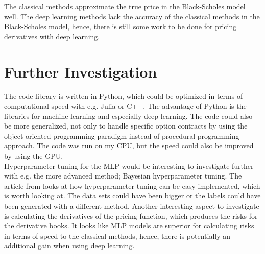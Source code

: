 The classical methods approximate the true price in the Black-Scholes model well. The deep learning methods lack the accuracy of the classical methods in the Black-Scholes model, hence, there is still some work to be done for pricing derivatives with deep learning. 

\section{Further Investigation}
The code library is written in Python, which could be optimized in terms of computational speed with e.g. Julia or C++. The advantage of Python is the libraries for machine learning and especially deep learning. The code could also be more generalized, not only to handle specific option contracts by using the object oriented programming paradigm instead of procedural programming approach. The code was run on my CPU, but the speed could also be improved by using the GPU.\\

Hyperparameter tuning for the MLP would be interesting to investigate further with e.g. the more advanced method; Bayesian hyperparameter tuning. The article from \parencite{liaw2018tune} looks at how hyperparameter tuning can be easy implemented, which is worth looking at. The data sets could have been bigger or the labels could have been generated with a different method. Another interesting aspect to investigate is calculating the derivatives of the pricing function, which produces the risks for the derivative books. It looks like MLP models are superior for calculating risks in terms of speed to the classical methods, hence, there is potentially an additional gain when using deep learning.\\


